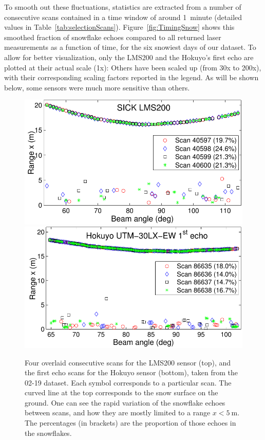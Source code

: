 To smooth out these fluctuations, statistics are extracted from a number of consecutive scans contained in a time window of around 1~minute (detailed values in Table~\ref{tab:selectionScans}). Figure~\ref{fig:TimingSnow} shows this smoothed fraction of snowflake echoes compared to all returned laser measurements as a function of time, for the six snowiest days of our dataset. To allow for better visualization, only the LMS200 and the Hokuyo's first echo are plotted at their actual scale (1x): Others have been scaled up (from 30x to 200x), with their corresponding scaling factors reported in the legend. As will be shown below, some sensors were much more sensitive than others.

\begin{figure}
    \centering
    \includegraphics[trim={0.2cm 0 0 0},clip,width=0.7\linewidth]{./img/chap_lidar/LMS200_4Scans_Feb19.pdf}
    \includegraphics[trim={0.2cm 0 0 0},clip,width=0.7\linewidth]{./img/chap_lidar/Hokuyo_4Scans_Feb19.pdf}
    \caption[Four overlaid consecutive scans for the LMS200 sensor, and the first echo scans for the Hokuyo sensor.]{Four overlaid consecutive scans for the LMS200 sensor (top), and the first echo scans for the Hokuyo sensor (bottom), taken from the 02-19 dataset. Each symbol corresponds to a particular scan. The curved line at the top corresponds to the snow surface on the ground. One can see the rapid variation of the snowflake echoes between scans, and how they are mostly limited to a range $x<\SI{5}{\meter}$. The percentages (in brackets) are the proportion of those echoes in the snowflakes.}
    \label{fig:LMS200_4Scans_Feb19}
\end{figure}

